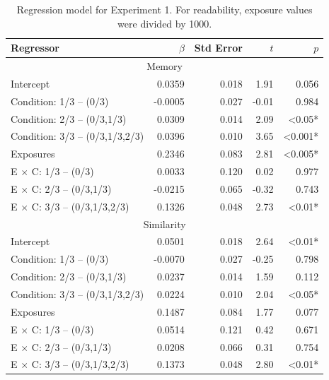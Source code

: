 \documentclass[man,floatsintext]{apa6}
\begin{document}
\newcommand{\ww}{\color{white}{*}} \newcommand\T{\rule{0pt}{2.1ex}}

\begin{table}[ht]
  \caption{Regression model for Experiment 1. For readability, exposure values were divided by 1000.}
  \label{expt1-regressions} 
  \begin{center}
  \footnotesize{
    \begin{tabular}{l r r r r}
      \hline
      Regressor & $\beta$ & Std Error & $t$ & $p$ \\ \hline
      \multicolumn{5}{c}{\T Memory \T}\\
      Intercept &  0.0359 &  0.018 &  1.91 & 0.056\ww\\
      Condition: 1/3 -- (0/3) & -0.0005 &  0.027 & -0.01 & 0.984\ww\\
      Condition: 2/3 -- (0/3,1/3) &  0.0309 &  0.014 &  2.09 & <0.05*\\
      Condition: 3/3 -- (0/3,1/3,2/3) &  0.0396 &  0.010 &  3.65 & <0.001*\\
      Exposures &  0.2346 &  0.083 &  2.81 & <0.005*\\
      E $\times$ C: 1/3 -- (0/3) &  0.0033 &  0.120 &  0.02 & 0.977\ww\\
      E $\times$ C: 2/3 -- (0/3,1/3) & -0.0215 &  0.065 & -0.32 & 0.743\ww\\
      E $\times$ C: 3/3 -- (0/3,1/3,2/3) &  0.1326 &  0.048 &  2.73 & <0.01* \\
      \hline

      \multicolumn{5}{c}{\T Similarity \T}\\
      Intercept &  0.0501 &  0.018 &  2.64 & <0.01*\\
      Condition: 1/3 -- (0/3) & -0.0070 &  0.027 & -0.25 & 0.798\ww\\
      Condition: 2/3 -- (0/3,1/3) &  0.0237 &  0.014 &  1.59 & 0.112\ww\\
      Condition: 3/3 -- (0/3,1/3,2/3) &  0.0224 &  0.010 &  2.04 & <0.05*\\
      Exposures &  0.1487 &  0.084 &  1.77 & 0.077\ww\\
      E $\times$ C: 1/3 -- (0/3) &  0.0514 &  0.121 &  0.42 & 0.671\ww\\
      E $\times$ C: 2/3 -- (0/3,1/3) &  0.0208 &  0.066 &  0.31 & 0.754\ww\\
      E $\times$ C: 3/3 -- (0/3,1/3,2/3) &  0.1373 &  0.048 &  2.80 & <0.01* \\
      \hline


\end{tabular}}
\end{center}
\end{table}
\end{document}
